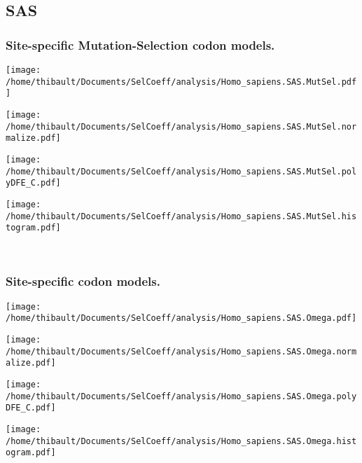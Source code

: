 \subsection{SAS} 
 
\subsubsection*{Site-specific Mutation-Selection codon models.} 
\begin{minipage}{0.49\linewidth} 
\texttt{[image: /home/thibault/Documents/SelCoeff/analysis/Homo\_sapiens.SAS.MutSel.pdf]} 
\end{minipage}
\begin{minipage}{0.49\linewidth} 
\texttt{[image: /home/thibault/Documents/SelCoeff/analysis/Homo\_sapiens.SAS.MutSel.normalize.pdf]} 
\end{minipage}
\begin{minipage}{0.49\linewidth} 
\texttt{[image: /home/thibault/Documents/SelCoeff/analysis/Homo\_sapiens.SAS.MutSel.polyDFE\_C.pdf]} 
\end{minipage}
\begin{minipage}{0.49\linewidth} 
\texttt{[image: /home/thibault/Documents/SelCoeff/analysis/Homo\_sapiens.SAS.MutSel.histogram.pdf]} 
\end{minipage}
\\ 
\subsubsection*{Site-specific codon models.} 
\begin{minipage}{0.49\linewidth} 
\texttt{[image: /home/thibault/Documents/SelCoeff/analysis/Homo\_sapiens.SAS.Omega.pdf]} 
\end{minipage}
\begin{minipage}{0.49\linewidth} 
\texttt{[image: /home/thibault/Documents/SelCoeff/analysis/Homo\_sapiens.SAS.Omega.normalize.pdf]} 
\end{minipage}
\begin{minipage}{0.49\linewidth} 
\texttt{[image: /home/thibault/Documents/SelCoeff/analysis/Homo\_sapiens.SAS.Omega.polyDFE\_C.pdf]} 
\end{minipage}
\begin{minipage}{0.49\linewidth} 
\texttt{[image: /home/thibault/Documents/SelCoeff/analysis/Homo\_sapiens.SAS.Omega.histogram.pdf]} 
\end{minipage}
\\ 
